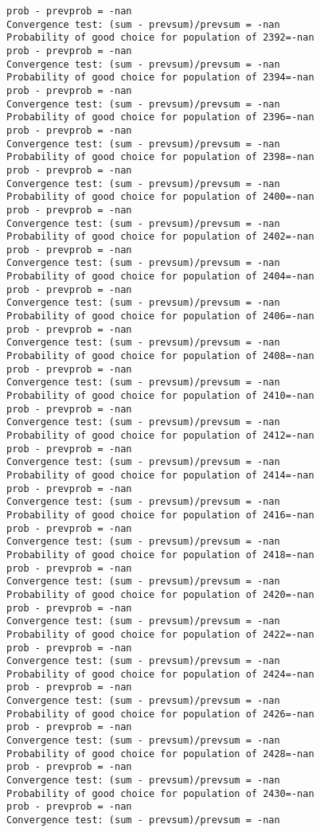 \documentclass[11pt,onecolumn]{article}
\begin{document}
\begin{verbatim}
prob - prevprob = -nan
Convergence test: (sum - prevsum)/prevsum = -nan
Probability of good choice for population of 2392=-nan
prob - prevprob = -nan
Convergence test: (sum - prevsum)/prevsum = -nan
Probability of good choice for population of 2394=-nan
prob - prevprob = -nan
Convergence test: (sum - prevsum)/prevsum = -nan
Probability of good choice for population of 2396=-nan
prob - prevprob = -nan
Convergence test: (sum - prevsum)/prevsum = -nan
Probability of good choice for population of 2398=-nan
prob - prevprob = -nan
Convergence test: (sum - prevsum)/prevsum = -nan
Probability of good choice for population of 2400=-nan
prob - prevprob = -nan
Convergence test: (sum - prevsum)/prevsum = -nan
Probability of good choice for population of 2402=-nan
prob - prevprob = -nan
Convergence test: (sum - prevsum)/prevsum = -nan
Probability of good choice for population of 2404=-nan
prob - prevprob = -nan
Convergence test: (sum - prevsum)/prevsum = -nan
Probability of good choice for population of 2406=-nan
prob - prevprob = -nan
Convergence test: (sum - prevsum)/prevsum = -nan
Probability of good choice for population of 2408=-nan
prob - prevprob = -nan
Convergence test: (sum - prevsum)/prevsum = -nan
Probability of good choice for population of 2410=-nan
prob - prevprob = -nan
Convergence test: (sum - prevsum)/prevsum = -nan
Probability of good choice for population of 2412=-nan
prob - prevprob = -nan
Convergence test: (sum - prevsum)/prevsum = -nan
Probability of good choice for population of 2414=-nan
prob - prevprob = -nan
Convergence test: (sum - prevsum)/prevsum = -nan
Probability of good choice for population of 2416=-nan
prob - prevprob = -nan
Convergence test: (sum - prevsum)/prevsum = -nan
Probability of good choice for population of 2418=-nan
prob - prevprob = -nan
Convergence test: (sum - prevsum)/prevsum = -nan
Probability of good choice for population of 2420=-nan
prob - prevprob = -nan
Convergence test: (sum - prevsum)/prevsum = -nan
Probability of good choice for population of 2422=-nan
prob - prevprob = -nan
Convergence test: (sum - prevsum)/prevsum = -nan
Probability of good choice for population of 2424=-nan
prob - prevprob = -nan
Convergence test: (sum - prevsum)/prevsum = -nan
Probability of good choice for population of 2426=-nan
prob - prevprob = -nan
Convergence test: (sum - prevsum)/prevsum = -nan
Probability of good choice for population of 2428=-nan
prob - prevprob = -nan
Convergence test: (sum - prevsum)/prevsum = -nan
Probability of good choice for population of 2430=-nan
prob - prevprob = -nan
Convergence test: (sum - prevsum)/prevsum = -nan

\end{verbatim}
\end{document}

